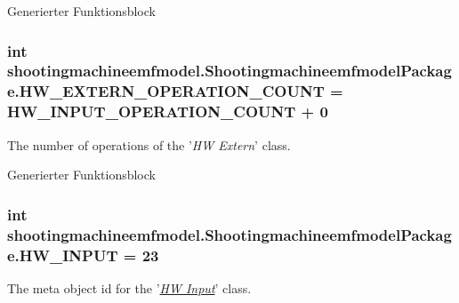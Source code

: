 Generierter Funktionsblock  \hypertarget{interfaceshootingmachineemfmodel_1_1_shootingmachineemfmodel_package_a509c88e538f3bdfaec8ece9d4893b897}{
\subsubsection[{H\-W\-\_\-\-E\-X\-T\-E\-R\-N\-\_\-\-O\-P\-E\-R\-A\-T\-I\-O\-N\-\_\-\-C\-O\-U\-N\-T}]{\setlength{\rightskip}{0pt plus 5cm}int shootingmachineemfmodel.\-Shootingmachineemfmodel\-Package.\-H\-W\-\_\-\-E\-X\-T\-E\-R\-N\-\_\-\-O\-P\-E\-R\-A\-T\-I\-O\-N\-\_\-\-C\-O\-U\-N\-T = {\bf H\-W\-\_\-\-I\-N\-P\-U\-T\-\_\-\-O\-P\-E\-R\-A\-T\-I\-O\-N\-\_\-\-C\-O\-U\-N\-T} + 0}}\label{interfaceshootingmachineemfmodel_1_1_shootingmachineemfmodel_package_a509c88e538f3bdfaec8ece9d4893b897}
The number of operations of the '{\itshape H\-W Extern}' class.

Generierter Funktionsblock  \hypertarget{interfaceshootingmachineemfmodel_1_1_shootingmachineemfmodel_package_ac939588ce4eb2f893f81c08e82d43c06}{
\subsubsection[{H\-W\-\_\-\-I\-N\-P\-U\-T}]{\setlength{\rightskip}{0pt plus 5cm}int shootingmachineemfmodel.\-Shootingmachineemfmodel\-Package.\-H\-W\-\_\-\-I\-N\-P\-U\-T = 23}}\label{interfaceshootingmachineemfmodel_1_1_shootingmachineemfmodel_package_ac939588ce4eb2f893f81c08e82d43c06}
The meta object id for the '\hyperlink{classshootingmachineemfmodel_1_1impl_1_1_h_w_input_impl}{{\itshape H\-W Input}}' class.

